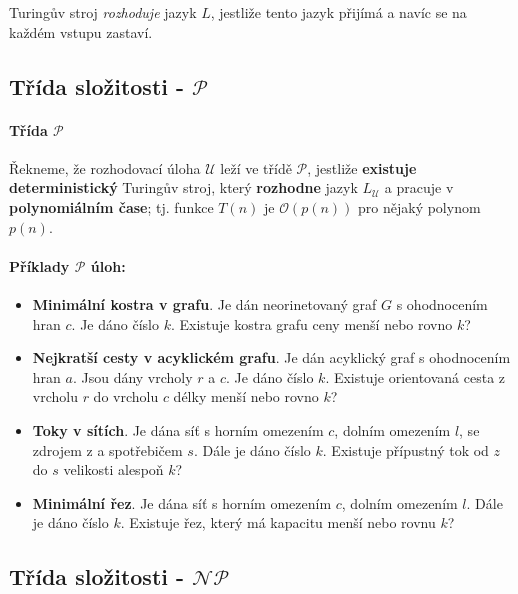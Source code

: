 Turingův stroj \textit{rozhoduje} jazyk $L$, jestliže tento jazyk přijímá a navíc se na každém vstupu zastaví.

\subsection*{Třída složitosti -  $\mathcal{P}$}
\label{heading:p}

\paragraph{Třída $\mathcal{P}$} Řekneme, že rozhodovací úloha $\mathcal{U}$ leží ve třídě $\mathcal{P}$, jestliže \textbf{existuje deterministický} Turingův stroj, který \textbf{rozhodne} jazyk $L_\mathcal{U}$ a pracuje v \textbf{polynomiálním čase}; tj. funkce $T(n)$ je $\mathcal{O}(p(n))$ pro nějaký polynom $p(n)$.

\paragraph{Příklady $\mathcal{P}$ úloh:}
\begin{itemize}[itemsep=0pt]
    \item \textbf{\color{darkBrown}Minimální kostra v grafu}. Je dán neorinetovaný graf $G$ s ohodnocením hran $c$. Je dáno číslo $k$. Existuje kostra grafu ceny menší nebo rovno $k$?
    
    \item \textbf{\color{darkBrown}Nejkratší cesty v acyklickém grafu}. Je dán acyklický graf s ohodnocením hran $a$. Jsou dány vrcholy $r$ a $c$. Je dáno číslo $k$. Existuje orientovaná cesta z vrcholu $r$ do vrcholu $c$ délky menší nebo rovno $k$?
    
    \item \textbf{\color{darkBrown}Toky v sítích}. Je dána síť s horním omezením $c$, dolním omezením $l$, se zdrojem z a spotřebičem $s$. Dále je dáno číslo $k$. Existuje přípustný tok od $z$ do $s$ velikosti alespoň $k$?
    
    \item \textbf{\color{darkBrown}Minimální řez}. Je dána síť s horním omezením $c$, dolním omezením $l$. Dále je dáno číslo $k$. Existuje řez, který má kapacitu menší nebo rovnu $k$?
\end{itemize}

\subsection*{Třída složitosti - $\mathcal{NP}$}
\label{heading:np}

